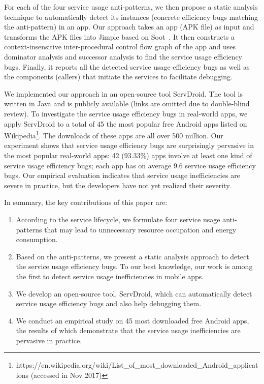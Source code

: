 \documentclass[sigconf,review, anonymous]{acmart}
\begin{document}
For each of the four service usage anti-patterns, we then propose a static
analysis technique to automatically detect its instances (concrete efficiency
bugs matching the anti-pattern) in an app.
Our approach takes an app (APK file) as input and transforms the APK files into
Jimple based on Soot~\cite{sootpaper}. It then constructs a
context-insensitive inter-procedural control flow graph of the app and uses
dominator analysis and successor analysis to find the service usage efficiency
bugs.
Finally, it reports all the
detected service usage efficiency bugs as well as the components (callers) that
initiate the services to facilitate debugging.

We implemented our approach in an open-source tool \textsf{ServDroid}. The tool
is written in Java and is publicly available (links are omitted due to double-blind review).
To investigate the service usage efficiency bugs in real-world apps, we apply
\textsf{ServDroid} to a total of 45 the most popular free Android apps listed on
Wikipedia\footnote{https://en.wikipedia.org/wiki/List\_of\_most\_downloaded\_Android\_applications (accessed in Nov 2017)}.
The downloads of these apps are all over 500 million. Our experiment shows that
service usage efficiency bugs are surprisingly pervasive in the most popular
real-world apps: 42 (93.33\%) apps involve at least one kind of service usage
efficiency bugs; each app has on average 9.6 service usage efficiency bugs.
Our empirical evaluation indicates that service usage inefficiencies are
severe in practice, but the developers have not yet realized their severity.


In summary, the key contributions of this paper are:
\begin{enumerate}
\item According to the service lifecycle, we formulate four service usage
anti-patterns that may lead to unnecessary resource occupation and energy consumption.
\item Based on the anti-patterns, we present a static analysis approach to
detect the service usage efficiency bugs. To our best knowledge, our work
is among the first to detect service usage inefficiencies in mobile apps.
\item We develop an open-source tool, \textsf{ServDroid}, which can
automatically detect service usage efficiency bugs and also help debugging
them.
\item We conduct an empirical study on 45 most downloaded free Android apps,
the results of which demonstrate that the service usage inefficiencies are pervasive in practice.
\end{enumerate}
\end{document}
